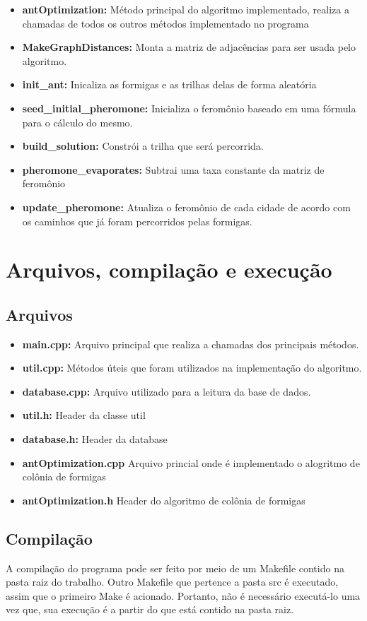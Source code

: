 \documentclass[a4paper, 12pt]{article}
\begin{document}
\begin{itemize}
\item \textbf{antOptimization:} Método principal do algoritmo implementado, realiza a chamadas de todos os outros métodos implementado no programa
\item \textbf{MakeGraphDistances:} Monta a matriz de adjacências para ser usada pelo algoritmo.
\item \textbf{init\_ant:} Inicaliza as formigas e as trilhas delas de forma aleatória
\item \textbf{seed\_initial\_pheromone:} Inicializa o feromônio baseado em uma fórmula para o cálculo do mesmo.
\item \textbf{build\_solution:} Constrói a trilha que será percorrida.
\item \textbf{pheromone\_evaporates:} Subtrai uma taxa constante da matriz de feromônio
\item \textbf{update\_pheromone:} Atualiza o feromônio de cada cidade de acordo com os caminhos que já foram percorridos pelas formigas.
\end{itemize}



\section{Arquivos, compilação e execução}
\subsection{Arquivos}
\begin{itemize}
\item \textbf{main.cpp:} Arquivo principal que realiza a chamadas dos principais métodos.
\item \textbf{util.cpp:} Métodos úteis que foram utilizados na implementação do algoritmo.
\item \textbf{database.cpp:} Arquivo utilizado para a leitura da base de dados.
\item \textbf{util.h:} Header da classe util
\item \textbf{database.h:} Header da database
\item \textbf{antOptimization.cpp} Arquivo princial onde é implementado o alogritmo de colônia de formigas
\item \textbf{antOptimization.h} Header do algoritmo de colônia de formigas
\end{itemize}

\subsection{Compilação}
A compilação do programa pode ser feito por meio de um Makefile contido na pasta raiz do trabalho. Outro Makefile que pertence a pasta src é executado, assim que o primeiro Make é acionado. Portanto, não é necessário executá-lo uma vez que, sua execução é a partir do que está contido na pasta raiz.
\end{document}
